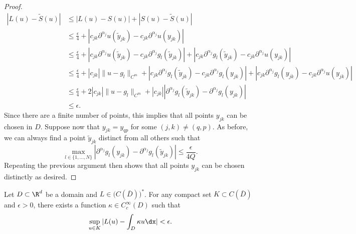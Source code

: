 \begin{proof}
\begin{align*}
|L(u) - \tilde{S}(u)| &\leq |L(u) - S(u)| + |S(u) - \tilde{S}(u)| \\
&\leq \frac{\epsilon}{4} + |c_{jk} \partial^{\alpha_j} u(\tilde{y}_{jk}) - c_{jk} \partial^{\alpha_j} u(y_{jk})| \\
&\leq \frac{\epsilon}{4} + |c_{jk} \partial^{\alpha_j} u(\tilde{y}_{jk}) - c_{jk} \partial^{\alpha_j} g_l(\tilde{y}_{jk})| + |c_{jk} \partial^{\alpha_j} g_l(\tilde{y}_{jk}) - c_{jk} \partial^{\alpha_j} u(y_{jk})| \\
&\leq \frac{\epsilon}{4} + |c_{jk}|\|u - g_l\|_{C^m} + |c_{jk} \partial^{\alpha_j} g_l(\tilde{y}_{jk}) - c_{jk} \partial^{\alpha_j} g_l(y_{jk})| + |c_{jk} \partial^{\alpha_j} g_l(y_{jk}) - c_{jk} \partial^{\alpha_j} u(y_{jk})| \\
&\leq \frac{\epsilon}{4}  + 2|c_{jk}|\|u - g_l\|_{C^m} + |c_{jk}| |\partial^{\alpha_j} g_l(\tilde{y}_{jk}) - \partial^{\alpha_j} g_l(y_{jk})| \\
&\leq \epsilon.
\end{align*} 
Since there are a finite number of points, this implies that all points \(y_{jk}\) can be chosen in \(D\). Suppose now 
that \(y_{jk} = y_{qp}\) for some \((j,k) \neq (q,p)\). As before, we can always find a point \(\tilde{y}_{jk}\)
distinct from all others such that
\[\max_{l \in \{1,\dots,N\}} |\partial^{\alpha_j} g_l (y_{jk}) - \partial^{\alpha_j} g_l (\tilde{y}_{jk})| \leq \frac{\epsilon}{4Q}.\]
Repeating the previous argument then shows that all points \(y_{jk}\) can be chosen distinctly as desired.
\end{proof}

\begin{lemma}
\label{lemma:c_kernelapprox}
Let \(D \subset \R^d\) be a domain and \(L \in \bigl ( C(\bar{D}) \bigl)^*\). 
For any compact set \(K \subset C(\bar{D})\) and \(\epsilon > 0\),
there exists a function \(\kappa \in C^\infty_c (D)\) such that
\[\sup_{u \in K} |L(u) - \int_D \kappa  u \dx| < \epsilon.\]
\end{lemma}

